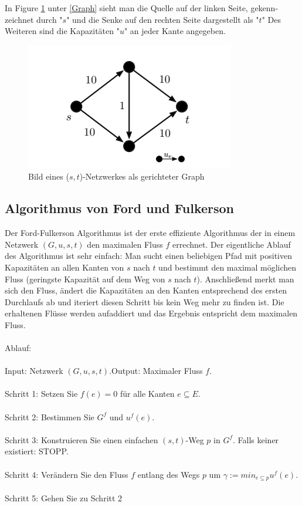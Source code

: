 \documentclass[a4paper]{llncs}
\begin{document}
In Figure \ref{fig:Graph1} unter \ref{Graph} sieht man die Quelle auf der linken Seite, gekenn-zeichnet durch "$s$" und die Senke auf den rechten Seite dargestellt als "$t$" Des Weiteren sind die Kapazitäten "$u$" an jeder Kante angegeben. 

\begin{figure}[htbp] 
  \centering
     \includegraphics{graph1} 
  \caption{Bild eines ($s,t$)-Netzwerkes als gerichteter Graph \citep{GuN}}
  \label{fig:Graph1}
\end{figure}

\subsection{Algorithmus von Ford und Fulkerson}
\label{FuF}
Der Ford-Fulkerson Algorithmus ist der erste effiziente Algorithmus der in einem Netzwerk $(G,u,s,t)$ den maximalen Fluss $f$ errechnet. Der eigentliche Ablauf des Algorithmus ist sehr einfach: Man sucht einen beliebigen Pfad mit positiven Kapazitäten an allen Kanten von $s$ nach $t$ und bestimmt den maximal möglichen Fluss (geringste Kapazität auf dem Weg von $s$ nach $t$). Anschließend merkt man sich den Fluss, ändert die Kapazitäten an den Kanten entsprechend des ersten Durchlaufs ab und iteriert diesen Schritt bis kein Weg mehr zu finden ist. Die erhaltenen Flüsse werden aufaddiert und das Ergebnis entspricht dem maximalen Fluss.\\ \\Ablauf:\\ \\Input: Netzwerk $(G, u, s, t)$.\qquad Output: Maximaler Fluss $f$.\\ \\
Schritt 1: Setzen Sie $f(e) = 0$ für alle Kanten $e \subseteq E$.\\ \\Schritt 2: Bestimmen Sie $G^{f}$ und $u^{f}(e)$.\\ \\Schritt 3: Konstruieren Sie einen einfachen $(s, t)$-Weg $p$ in $G^{f}$. Falls keiner existiert:
STOPP.\\ \\Schritt 4: Verändern Sie den Fluss $f$ entlang des Wegs $p$ um $\gamma := min_{e \subseteq p}u^{f} (e)$.\\ \\Schritt 5: Gehen Sie zu Schritt 2\\ \\
\citep{GuN} \\ \\
\end{document}
